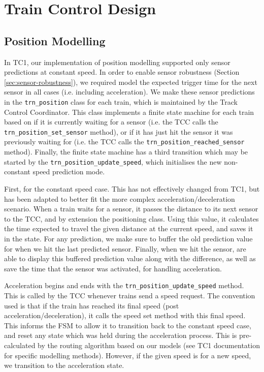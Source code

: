 \documentclass[12pt, titlepage]{article}
\begin{document}
    \section{Train Control Design}
    
    \subsection{Position Modelling}
    \label{sec:positioning}
    
    In TC1, our implementation of position modelling supported only sensor predictions at constant speed. In order to enable sensor robustness (Section \ref{sec:sensor-robustness}), we required model the expected trigger time for the next sensor in all cases (i.e. including acceleration). We make these sensor predictions in the \verb`trn_position` class for each train, which is maintained by the Track Control Coordinator. This class implements a finite state machine for each train based on if it is currently waiting for a sensor (i.e. the TCC calls the \verb`trn_position_set_sensor` method), or if it has just hit the sensor it was previously waiting for (i.e. the TCC calls the \verb`trn_position_reached_sensor` method). Finally, the finite state machine has a third transition which may be started by the \verb`trn_position_update_speed`, which initialises the new non-constant speed prediction mode.
    
    First, for the constant speed case. This has not effectively changed from TC1, but has been adapted to better fit the more complex acceleration/deceleration scenario. When a train waits for a sensor, it passes the distance to its next sensor to the TCC, and by extension the positioning class. Using this value, it calculates the time expected to travel the given distance at the current speed, and saves it in the state. For any prediction, we make sure to buffer the old prediction value for when we hit the last predicted sensor. Finally, when we hit the sensor, are able to display this buffered prediction value along with the difference, as well as save the time that the sensor was activated, for handling acceleration.
    
    Acceleration begins and ends with the \verb`trn_position_update_speed` method. This is called by the TCC whenever trains send a speed request. The convention used is that if the train has reached its final speed (post acceleration/deceleration), it calls the speed set method with this final speed. This informs the FSM to allow it to transition back to the constant speed case, and reset any state which was held during the acceleration process. This is pre-calculated by the routing algorithm based on our models (see TC1 documentation for specific modelling methods). However, if the given speed is for a new speed, we transition to the acceleration state.
    
\end{document}
